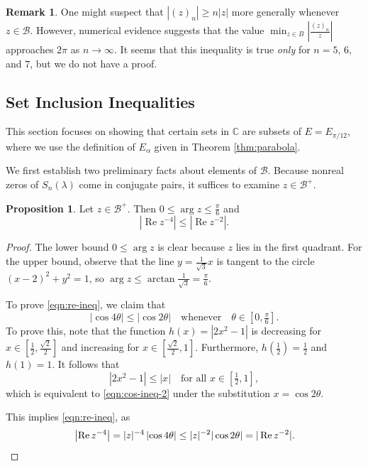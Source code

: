 \documentclass[11pt]{article}
\theoremstyle{definition}
\newtheorem{prop}{Proposition}
\newtheorem{remark}{Remark}
\newcommand{\stern}[2]{S_{#1}(#2)}
\renewcommand{\Re}{\operatorname{Re}}
\newcommand{\lm}{\lambda}
\newcommand{\C}{\mathbb C}
\newcommand{\calB}{\mathcal B}
\newcommand{\abs}[1]{\left|#1\right|}
\begin{document}
\begin{remark}
	One might suspect that $|(z)_n| \geq n |z|$ more generally whenever $z\in\calB$.  However, numerical evidence suggests that the value $\min_{z\in B}\abs{\tfrac{(z)_n}{z}}$ approaches $2\pi$ as $n\to\infty$.  It seems that this inequality is true \textit{only} for $n = 5$, $6$, and $7$, but we do not have a proof.
\end{remark}

\subsection{Set Inclusion Inequalities}

This section focuses on showing that certain sets in $\C$ are subsets of $E = E_{\pi/12}$, where we use the definition of $E_\alpha$ given in Theorem \ref{thm:parabola}.  

\par We first establish two preliminary facts about elements of $\calB$. Because nonreal zeros of $\stern n\lm$ come in conjugate pairs, it suffices to examine $z\in\calB^+$.

\begin{prop}\label{prop:silli}
	Let $z\in\calB^+$.  Then $0\leq \arg z \leq \tfrac\pi 6$ and
	\begin{equation}\label{eqn:re-ineq}
		|\Re z^{-4}|\leq |\Re z^{-2}|.
	\end{equation}
\end{prop}

\begin{proof}
	The lower bound $0\leq \arg z$ is clear because $z$ lies in the first quadrant.  For the upper bound, observe that the line $y = \tfrac{1}{\sqrt 3}x$ is tangent to the circle $(x-2)^2+y^2 = 1$, so $\arg z\leq \arctan \tfrac{1}{\sqrt 3} = \tfrac\pi 6$.
	
	\par To prove \eqref{eqn:re-ineq}, we claim that
	\begin{equation}\label{eqn:cos-ineq-2}
		\abs{\cos 4\theta} \leq \abs{\cos 2\theta} \quad\text{whenever}\quad \theta\in[0,\tfrac\pi 6].
	\end{equation}
	To prove this, note that the function $h(x) = |2x^2 - 1|$ is decreasing for $x\in[\tfrac12,\tfrac{\sqrt 2}2]$ and increasing for $x \in[\tfrac{\sqrt 2}2, 1]$.  Furthermore, $h(\tfrac12) = \tfrac12$ and $h(1) = 1$.  It follows that 
	\[
	|2x^2 - 1|\leq |x|\quad\text{for all }x\in[\tfrac12,1],
	\]
	which is equivalent to \eqref{eqn:cos-ineq-2} under the substitution $x = \cos 2\theta$.
	
	\par This implies \eqref{eqn:re-ineq}, as
	\[
	\abs{\Re z^{-4}} = |z|^{-4}\abs{\cos 4\theta} \leq |z|^{-2}|\cos 2\theta| = |\Re z^{-2}|. \qedhere
	\]
\end{proof}
\end{document}
